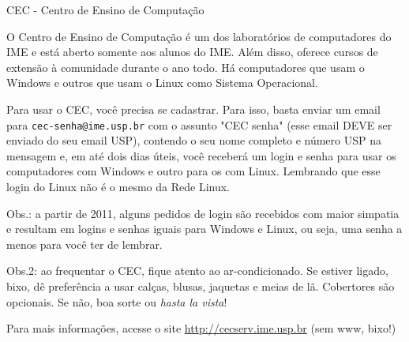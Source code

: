 \begin{secao}{CEC - Centro de Ensino de Computação}

O Centro de Ensino de Computação é um dos laboratórios de computadores do IME e está
aberto somente aos alunos do IME. Além disso, oferece cursos de extensão à comunidade 
durante o ano todo. Há computadores que usam o Windows e outros que usam o Linux como
Sistema Operacional.

Para usar o CEC, você precisa se cadastrar. Para isso, basta enviar um email para
{\tt cec-senha@ime.usp.br} com o assunto "CEC senha" (esse email DEVE ser
enviado do seu email USP), contendo o seu nome completo e número USP na mensagem
e, em até dois dias úteis, você receberá um login e senha para usar os computadores
com Windows e outro para os com Linux. Lembrando que esse login do Linux não é o mesmo
da Rede Linux.

Obs.: a partir de 2011, alguns pedidos de login são recebidos com maior simpatia e
resultam em logins e senhas iguais para Windows e Linux, ou seja, uma senha a
menos para você ter de lembrar.

Obs.2: ao frequentar o CEC, fique atento ao ar-condicionado. Se
estiver ligado, bixo, dê preferência a usar calças, blusas, jaquetas e meias de
lã. Cobertores são opcionais. Se não, boa sorte ou \textit{hasta la vista}!

Para mais informações, acesse o site \url{http://cecserv.ime.usp.br} (sem www, bixo!)
\end{secao}
